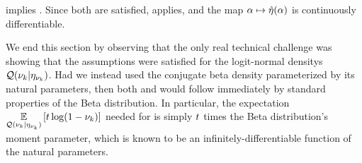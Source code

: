  implies .  Since both
 are satisfied,  applies,
and the map $\alpha \mapsto \hat\eta(\alpha)$ is continuously differentiable.

We end this section by observing that the only real technical challenge was
showing that the assumptions were satisfied for the logit-normal densitys
$\mathcal{Q}(\nu_{k} \vert \eta_{\nu_{k}})$.  Had we instead used the conjugate beta density
parameterized by its natural parameters, then both  and
 would follow immediately by standard properties of the
Beta distribution.  In particular, the expectation $\underset{\mathcal{Q}(\nu_{k} \vert
\eta_{\nu_{k}})}{\mathbb{E}}\left[t \log (1 - \nu_{k})\right]$ needed for  is simply $t$
times the Beta distribution's moment parameter, which is known to be an
infinitely-differentiable function of the natural parameters.

